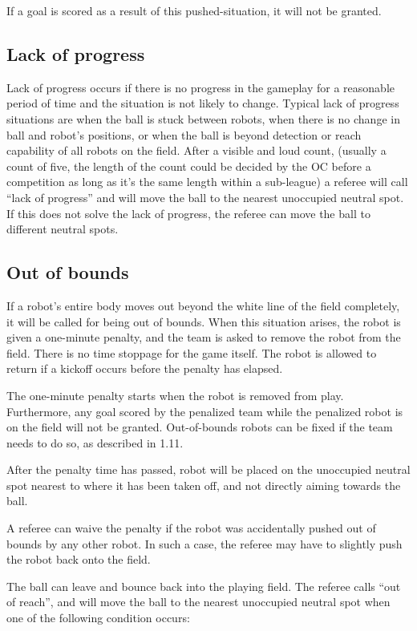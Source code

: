 \documentclass{article}
\begin{document}
If a goal is scored as a result of this pushed-situation, it will not be granted. 

\subsection{Lack of progress \label{ref-010}}

Lack of progress occurs if there is no progress in the gameplay for a reasonable period of time and the situation is not likely to change. Typical lack of progress situations are when the ball is stuck between robots, when there is no change in ball and robot's positions, or when the ball is beyond detection or reach capability of all robots on the field. After a visible and loud count, (usually a count of five, the length of the count could be decided by the OC before a competition as long as it's the same length within a sub-league) a referee will call ``lack of progress'' and will move the ball to the nearest unoccupied neutral spot. If this does not solve the lack of progress, the referee can move the ball to different neutral spots. 

\subsection{Out of bounds \label{ref-011}}

If a robot's entire body moves out beyond the white line of the field completely, it will be called for being out of bounds. When this situation arises, the robot is given a one-minute penalty, and the team is asked to remove the robot from the field. There is no time stoppage for the game itself. The robot is allowed to return if a kickoff occurs before the penalty has elapsed. 

The one-minute penalty starts when the robot is removed from play. Furthermore, any goal scored by the penalized team while the penalized robot is on the field will not be granted. Out-of-bounds robots can be fixed if the team needs to do so, as described in 1.11. 

After the penalty time has passed, robot will be placed on the unoccupied neutral spot nearest to where it has been taken off, and not directly aiming towards the ball. 

A referee can waive the penalty if the robot was accidentally pushed out of bounds by any other robot. In such a case, the referee may have to slightly push the robot back onto the field. 

The ball can leave and bounce back into the playing field. The referee calls ``out of reach'', and will move the ball to the nearest unoccupied neutral spot when one of the following condition occurs:
\end{document}
